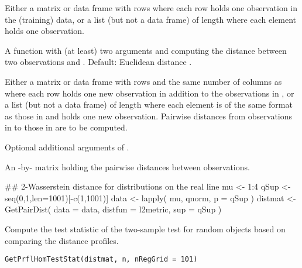 \documentclass[a4paper]{book}
\begin{document}
%
\begin{Arguments}
\begin{ldescription}
\item[\code{data}] Either a matrix or data frame with  rows where each row holds one observation 
in the (training) data, or a list (but not a data frame) of length  where each element holds one observation.

\item[\code{distfun}] A function with (at least) two arguments  and  
computing the distance between two observations  and . 
Default: Euclidean distance .

\item[\code{newdata}] Either a matrix or data frame with  rows and the same number of columns as  
where each row holds one new observation in addition to the observations in , 
or a list (but not a data frame) of length  where each element is of the same format as those in  
and holds one new observation. 
Pairwise distances from observations in  to those in  are to be computed.

\item[\code{...}] Optional additional arguments of .
\end{ldescription}
\end{Arguments}
%
\begin{Value}
An -by- matrix holding the pairwise distances between observations.
\end{Value}
%
\begin{Examples}
\begin{ExampleCode}
## 2-Wasserstein distance for distributions on the real line
mu <- 1:4
qSup <- seq(0,1,len=1001)[-c(1,1001)]
data <- lapply( mu, qnorm, p = qSup )
distmat <- GetPairDist( data = data, distfun = l2metric, sup = qSup )
\end{ExampleCode}
\end{Examples}
%
\begin{Description}\relax
Compute the test statistic of the two-sample test for random objects based on comparing the distance profiles.
\end{Description}
%
\begin{Usage}
\begin{verbatim}
GetPrflHomTestStat(distmat, n, nRegGrid = 101)
\end{verbatim}
\end{Usage}
\end{document}
